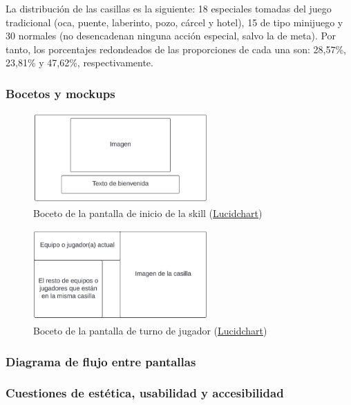 La distribución de las casillas es la siguiente: 18 especiales tomadas del juego tradicional (oca, puente, laberinto, pozo, cárcel y hotel), 15 de tipo minijuego y 30 normales (no desencadenan ninguna acción especial, salvo la de meta). Por tanto, los porcentajes redondeados de las proporciones de cada una son: 28,57\%, 23,81\% y 47,62\%, respectivamente. 

\subsubsection{Bocetos y mockups}

\begin{figure}[H]
    \centering
    \includegraphics[width=0.6\textwidth]{imgs/boceto-bienvenida.JPG}
    \caption{Boceto de la pantalla de inicio de la skill (\href{https://www.lucidchart.com/pages/es}{Lucidchart})}
    \label{fig:boceto-bienvenida}
\end{figure}

\begin{figure}[H]
    \centering
    \includegraphics[width=0.6\textwidth]{imgs/boceto-casilla.JPG}
    \caption{Boceto de la pantalla de turno de jugador (\href{https://www.lucidchart.com/pages/es}{Lucidchart})}
    \label{fig:boceto-casilla}
\end{figure}

\subsubsection{Diagrama de flujo entre pantallas}


\subsubsection{Cuestiones de estética, usabilidad y accesibilidad}

